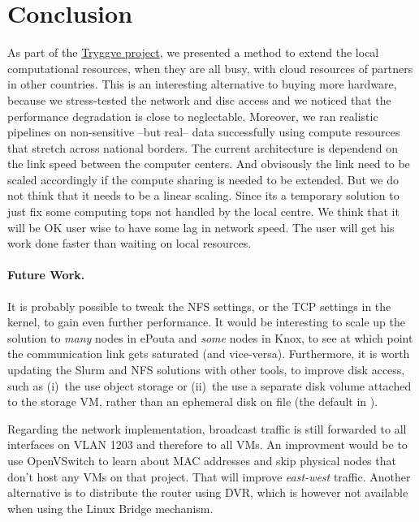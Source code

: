 \section{Conclusion}
\label{section:conclusion}

As part of the \href{https://wiki.neic.no/wiki/Tryggve}{Tryggve
  project}, we presented a method to extend the local computational
resources, when they are all busy, with cloud resources of partners in
other countries.
%
This is an interesting alternative to buying more hardware, because we
stress-tested the network and disc access and we noticed that the
performance degradation is close to neglectable.
%
Moreover, we ran realistic pipelines on non-sensitive --but real--
data successfully using compute resources that stretch across national
borders.
%
The current architecture is dependend on the link speed between the computer centers. And obvisously the link need to be scaled accordingly if the compute sharing is needed to be extended. But we do not think that it needs to be a linear scaling. Since its a temporary solution to just fix some computing tops not handled by the local centre. We think that it will be OK user wise to have some lag in network speed. The user will get his work done faster than waiting on local resources. 
%

\paragraph{Future Work.}
%
It is probably possible to tweak the NFS settings, or the TCP settings
in the kernel, to gain even further performance.
%
It would be interesting to scale up the solution to \emph{many} nodes
in ePouta and \emph{some} nodes in Knox, to see
at which point the communication link gets saturated (and vice-versa).
%
Furthermore, it is worth updating the Slurm and NFS solutions with
other tools, to improve disk access, such as (i)~the use object
storage or (ii)~the use a separate disk volume attached to the storage
VM, rather than an ephemeral disk on file (\ie the default in
).

Regarding the network implementation, broadcast traffic is still
forwarded to all interfaces on VLAN 1203 and therefore to all VMs. An
improvment would be to use OpenVSwitch to learn about MAC addresses
and skip physical nodes that don't host any VMs on that project. That
will improve \emph{east-west} traffic. Another alternative is to
distribute the router using DVR, which is however not available when
using the Linux Bridge mechanism.

